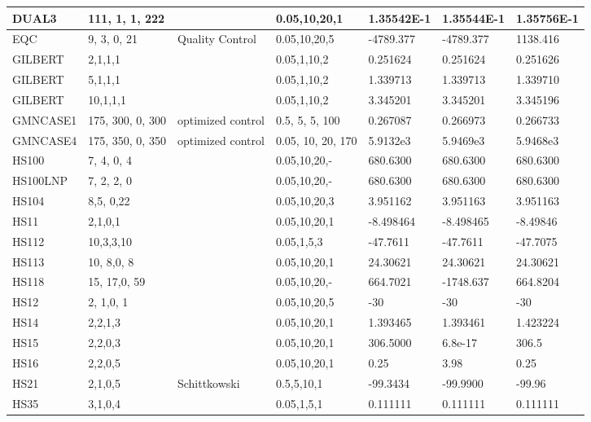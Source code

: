 \begin{landscape}
\begin{longtable}{l | l |  l  |  >{\footnotesize}p{3cm} | l | l | l    }
DUAL3 &  111, 1, 1, 222 &  & 0.05,10,20,1 &1.35542E-1  &    1.35544E-1  &   1.35756E-1\\ \hline
EQC &9, 3, 0, 21 & Quality Control & 0.05,10,20,5 & -4789.377 & -4789.377 & 1138.416 \\ \hline
GILBERT & 2,1,1,1 &  & 0.05,1,10,2  & 0.251624        &  0.251624     &  0.251626 \\ \hline
GILBERT & 5,1,1,1 &  & 0.05,1,10,2  & 1.339713        &  1.339713    &  1.339710 \\ \hline
GILBERT &10,1,1,1 &  & 0.05,1,10,2  & 3.345201       &  3.345201    &  3.345196 \\ \hline
GMNCASE1 &   175, 300, 0, 300  &   optimized control   & 0.5, 5, 5, 100   &   0.267087  & 0.266973             &    0.266733   \\ \hline
GMNCASE4 & 175, 350, 0, 350  &  optimized control &  0.05, 10, 20, 170      & 5.9132e3 &  5.9469e3 &   5.9468e3 \\ \hline 
HS100  & 7, 4, 0, 4 & &0.05,10,20,- &  680.6300 & 680.6300 & 680.6300  \\ \hline
HS100LNP & 7, 2, 2, 0 & & 0.05,10,20,-  &  680.6300 & 680.6300 & 680.6300 \\ \hline
HS104 &   8,5, 0,22 & &  0.05,10,20,3 & 3.951162  &     3.951163 &  3.951163    \\ \hline
HS11  &  2,1,0,1 & & 0.05,10,20,1     & -8.498464 &     -8.498465 & -8.49846   \\ \hline
HS112 & 10,3,3,10 & & 0.05,1,5,3 & -47.7611 &  -47.7611 & -47.7075   \\ \hline
HS113 &10, 8,0, 8 & & 0.05,10,20,1 & 24.30621 & 24.30621 & 24.30621   \\ \hline
HS118 &  15, 17,0, 59 & &  0.05,10,20,- & 664.7021 & -1748.637  & 664.8204  \\ \hline
HS12 &  2, 1,0, 1 & &   0.05,10,20,5 & -30 & -30 & -30   \\ \hline
HS14 & 2,2,1,3 & &   0.05,10,20,1  &   1.393465 &  1.393461               & 1.423224\\ \hline
HS15 &  2,2,0,3 & &   0.05,10,20,1 &    306.5000 & 6.8e-17 & 306.5 \\ \hline
HS16 &  2,2,0,5 & &   0.05,10,20,1    & 0.25 & 3.98 &    0.25 \\ \hline
HS21    & 2,1,0,5   & Schittkowski  &  0.5,5,10,1   & -99.3434  & -99.9900  & -99.96    \\ \hline 
HS35   &   3,1,0,4  &             &  0.05,1,5,1    & 0.111111  & 0.111111   &   0.111111   \\ \hline 

\end{longtable}
\end{landscape}
